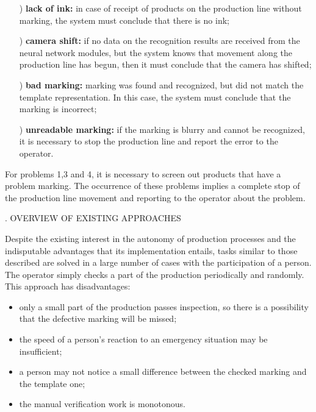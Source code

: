 \documentclass[a4paper, twocolumn]{article}
\begin{document}
\begin{enumerate}
    \setcounter{j}{0}
    \addtocounter{j}{1}
    \item[\arabic{j})]  \textbf{lack of ink:} in case of receipt of products on the
production line without marking, the system must
conclude that there is no ink;
    \addtocounter{j}{1}
    \item[\arabic{j})]  \textbf{camera shift:} if no data on the recognition results
are received from the neural network modules,
but the system knows that movement along the
production line has begun, then it must conclude
that the camera has shifted;
    \addtocounter{j}{1}
    \item[\arabic{j})] \textbf{bad marking:} marking was found and recognized,
but did not match the template representation.
In this case, the system must conclude that the
marking is incorrect;
    \addtocounter{j}{1}
    \item[\arabic{j})] \textbf{unreadable marking:} if the marking is blurry and
cannot be recognized, it is necessary to stop the
production line and report the error to the operator.
\end{enumerate}  
  
For problems 1,3 and 4, it is necessary to screen out
products that have a problem marking. The occurrence of
these problems implies a complete stop of the production
line movement and reporting to the operator about the
problem.

\begin{center}
    . OVERVIEW OF EXISTING APPROACHES
\end{center}
\addtocounter{chapter}{1}

Despite the existing interest in the autonomy of production processes and the indisputable advantages that its
implementation entails, tasks similar to those described
are solved in a large number of cases with the participation of a person. The operator simply checks a part of
the production periodically and randomly. This approach
has disadvantages:

\begin{itemize}
    \item only a small part of the production passes inspection, so there is a possibility that the defective
marking will be missed;
    \item the speed of a person’s reaction to an emergency
situation may be insufficient;
    \item a person may not notice a small difference between
the checked marking and the template one;
    \item the manual verification work is monotonous.
\end{itemize}
\end{document}
